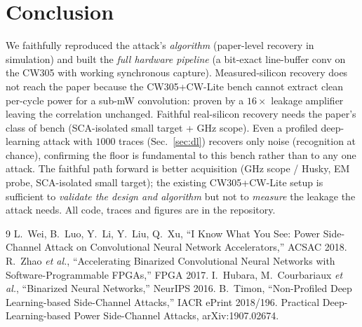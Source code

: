\documentclass[10pt]{article}
\begin{document}
\section{Conclusion}
We faithfully reproduced the attack's \emph{algorithm} (paper-level recovery in simulation)
and built the \emph{full hardware pipeline} (a bit-exact line-buffer conv on the CW305 with
working synchronous capture). Measured-silicon recovery does not reach the paper because the
CW305+CW-Lite bench cannot extract clean per-cycle power for a sub-mW convolution: proven by
a $16\times$ leakage amplifier leaving the correlation unchanged. Faithful real-silicon
recovery needs the paper's class of bench (SCA-isolated small target + GHz scope). Even a
profiled deep-learning attack with $1000$ traces (Sec.~\ref{sec:dl}) recovers only noise
(recognition at chance), confirming the floor is fundamental to this bench rather than to
any one attack. The faithful path forward is better acquisition (GHz scope / Husky, EM
probe, SCA-isolated small target); the existing CW305+CW-Lite setup is sufficient to
\emph{validate the design and algorithm} but not to \emph{measure} the leakage the attack
needs. All code, traces and figures are in the repository.

\begin{thebibliography}{9}\small
{} L.~Wei, B.~Luo, Y.~Li, Y.~Liu, Q.~Xu, ``I Know What You See: Power
Side-Channel Attack on Convolutional Neural Network Accelerators,'' ACSAC 2018.
 R.~Zhao \emph{et al.}, ``Accelerating Binarized Convolutional Neural
Networks with Software-Programmable FPGAs,'' FPGA 2017.
 I.~Hubara, M.~Courbariaux \emph{et al.}, ``Binarized Neural
Networks,'' NeurIPS 2016.
 B.~Timon, ``Non-Profiled Deep Learning-based Side-Channel Attacks,''
IACR ePrint 2018/196.
 Practical Deep-Learning-based Power Side-Channel Attacks, arXiv:1907.02674.
\end{thebibliography}
\end{document}

